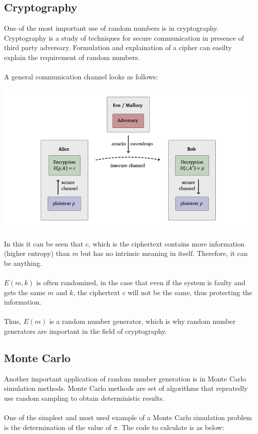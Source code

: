 \subsection{Cryptography}
One of the most important use of random numbers is in 
cryptography. Cryptography is a study of techniques for 
secure communication in presence of third party adversary.
Formulation and explaination of a cipher can easilty explain 
the requirement of random numbers.
\\\\
A general communication channel looks as follows:
\begin{center}
    \includegraphics[scale=0.5]{img/abe_comm.png}
\end{center}

\noindent In this it can be seen that $c$, which is the 
ciphertext contains more information (higher entropy) than 
$m$ but has no intrinsic meaning in itself. Therefore, 
it can be anything.
\\\\
$E(m,k)$ is often randomized, in the case that even 
if the system is faulty and gets the same $m$ and $k$, 
the ciphertext $c$ will not be the same, thus protecting 
the information.
\\\\
Thus, $E(m)$ is a random number generator, which is why 
random number generators are important in the field of 
cryptography.

\subsection{Monte Carlo}
Another important application of random number generation is 
in Monte Carlo simulation methods. Monte Carlo methods are set 
of algorithms that repeatedly use random sampling to obtain 
deterministic results.
\\\\
One of the simplest and most used example of a Monte Carlo 
simulation problem is the determination of the value of $\pi$.
The code to calculate is as below:


